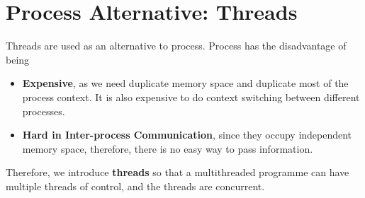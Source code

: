 \documentclass[11pt]{article}
\theoremstyle{definition}
\begin{document}
\section{Process Alternative: Threads}
Threads are used as an alternative to process. Process has the disadvantage of being
\begin{itemize}[itemsep=0pt]
  \item \textbf{Expensive}, as we need duplicate memory space and duplicate most of the process context. It is also expensive to do context switching between different processes.
  \item \textbf{Hard in Inter-process Communication}, since they occupy independent memory space, therefore, there is no easy way to pass information.
\end{itemize}
Therefore, we introduce \textbf{threads} so that a multithreaded programme can have multiple threads of control, and the threads are concurrent.\\
\end{document}
